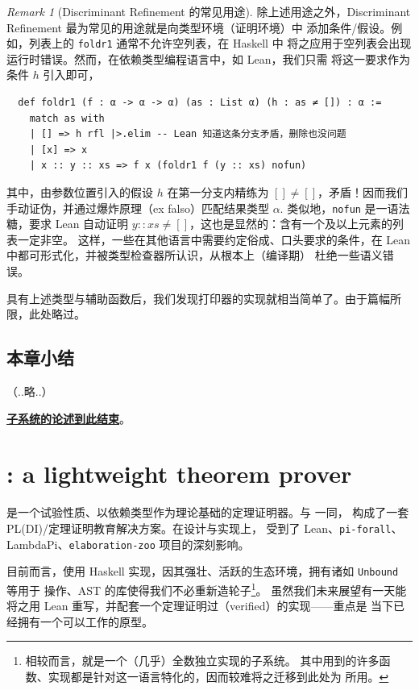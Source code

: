 \documentclass[a4paper, 11pt]{article}
\theoremstyle{remark}\newtheorem*{remark}{Remark}
\theoremstyle{definition}\newtheorem*{definition}{Definition}
\begin{document}
\begin{remark}[Discriminant Refinement 的常见用途]
除上述用途之外，Discriminant Refinement 最为常见的用途就是向类型环境（证明环境）中
添加条件/假设。例如，列表上的 \texttt{foldr1} 通常不允许空列表，在 Haskell 中
将之应用于空列表会出现运行时错误。然而，在依赖类型编程语言中，如 Lean，我们只需
将这一要求作为条件 $h$ 引入即可，
\begin{verbatim}
  def foldr1 (f : α -> α -> α) (as : List α) (h : as ≠ []) : α :=
    match as with
    | [] => h rfl |>.elim -- Lean 知道这条分支矛盾，删除也没问题
    | [x] => x
    | x :: y :: xs => f x (foldr1 f (y :: xs) nofun)
\end{verbatim}
其中，由参数位置引入的假设 $h$ 在第一分支内精练为 $[]\neq[]$，矛盾！因而我们手动证伪，并通过爆炸原理（ex falso）匹配结果类型 $\alpha$.
类似地，\texttt{nofun} 是一语法糖，要求 Lean 自动证明 $y :: xs \neq []$，这也是显然的：含有一个及以上元素的列表一定非空。
这样，一些在其他语言中需要约定俗成、口头要求的条件，在 Lean 中都可形式化，并被类型检查器所认识，从根本上（编译期）
杜绝一些语义错误。
\end{remark}

具有上述类型与辅助函数后，我们发现打印器的实现就相当简单了。由于篇幅所限，此处略过。

\subsection{本章小结}（..略..）

\vspace{1cm}

\begin{center}
\underline{\bf\Tigris 子系统的论述到此结束}。
\end{center}
\pagebreak

\section{\Tigrisd: a lightweight theorem prover}
\renewottcommands[dd]

\Tigrisd 是一个试验性质、以依赖类型作为理论基础的定理证明器。\Tigris 与 \Tigrisd 一同，
构成了一套 PL(DI)/定理证明教育解决方案。\Tigrisd 在设计与实现上，
受到了 Lean、\texttt{pi-forall}、LambdaPi、\texttt{elaboration-zoo} 项目的深刻影响。

目前而言，\Tigrisd 使用 Haskell 实现，因其强壮、活跃的生态环境，拥有诸如 \texttt{Unbound} 等用于
操作\lambdacalc、AST 的库使得我们不必重新造轮子\footnote{
相较而言，\Tigris 就是一个（几乎）全数独立实现的子系统。
其中用到的许多函数、实现都是针对这一语言特化的，因而较难将之迁移到此处为 \Tigrisd 所用。
}。
虽然我们未来展望有一天能将之用 Lean 重写，并配套一个定理证明过（verified）的实现——重点是
当下已经拥有一个可以工作的原型。
\end{document}
